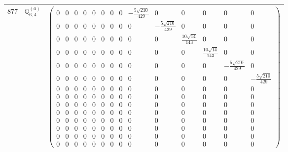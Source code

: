 \documentclass[fleqn,8pt,landscape]{jsarticle}
\begin{document}
\begin{center}
\begin{longtable}{ccc}
$ 877 $ & $ \mathbb{Q}_{6,4}^{(a)} $ & $ \begin{pmatrix} 0 & 0 & 0 & 0 & 0 & 0 & 0 & 0 & - \frac{5 \sqrt{210}}{429} & 0 & 0 & 0 & 0 & 0 \\ 0 & 0 & 0 & 0 & 0 & 0 & 0 & 0 & 0 & - \frac{5 \sqrt{210}}{429} & 0 & 0 & 0 & 0 \\ 0 & 0 & 0 & 0 & 0 & 0 & 0 & 0 & 0 & 0 & \frac{10 \sqrt{14}}{143} & 0 & 0 & 0 \\ 0 & 0 & 0 & 0 & 0 & 0 & 0 & 0 & 0 & 0 & 0 & \frac{10 \sqrt{14}}{143} & 0 & 0 \\ 0 & 0 & 0 & 0 & 0 & 0 & 0 & 0 & 0 & 0 & 0 & 0 & - \frac{5 \sqrt{210}}{429} & 0 \\ 0 & 0 & 0 & 0 & 0 & 0 & 0 & 0 & 0 & 0 & 0 & 0 & 0 & - \frac{5 \sqrt{210}}{429} \\ 0 & 0 & 0 & 0 & 0 & 0 & 0 & 0 & 0 & 0 & 0 & 0 & 0 & 0 \\ 0 & 0 & 0 & 0 & 0 & 0 & 0 & 0 & 0 & 0 & 0 & 0 & 0 & 0 \\ 0 & 0 & 0 & 0 & 0 & 0 & 0 & 0 & 0 & 0 & 0 & 0 & 0 & 0 \\ 0 & 0 & 0 & 0 & 0 & 0 & 0 & 0 & 0 & 0 & 0 & 0 & 0 & 0 \\ 0 & 0 & 0 & 0 & 0 & 0 & 0 & 0 & 0 & 0 & 0 & 0 & 0 & 0 \\ 0 & 0 & 0 & 0 & 0 & 0 & 0 & 0 & 0 & 0 & 0 & 0 & 0 & 0 \\ 0 & 0 & 0 & 0 & 0 & 0 & 0 & 0 & 0 & 0 & 0 & 0 & 0 & 0 \\ 0 & 0 & 0 & 0 & 0 & 0 & 0 & 0 & 0 & 0 & 0 & 0 & 0 & 0 \end{pmatrix} $ \\ \hline

\end{longtable}
\end{center}
\end{document}
